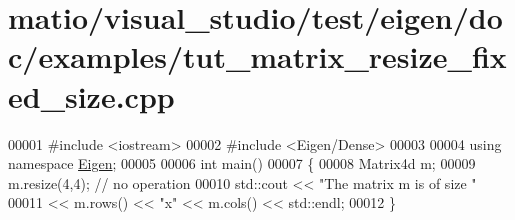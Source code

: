 \hypertarget{matio_2visual__studio_2test_2eigen_2doc_2examples_2tut__matrix__resize__fixed__size_8cpp_source}{}\section{matio/visual\+\_\+studio/test/eigen/doc/examples/tut\+\_\+matrix\+\_\+resize\+\_\+fixed\+\_\+size.cpp}
\label{matio_2visual__studio_2test_2eigen_2doc_2examples_2tut__matrix__resize__fixed__size_8cpp_source}

\begin{DoxyCode}
00001 \textcolor{preprocessor}{#include <iostream>}
00002 \textcolor{preprocessor}{#include <Eigen/Dense>}
00003 
00004 \textcolor{keyword}{using namespace }\hyperlink{namespace_eigen}{Eigen};
00005 
00006 \textcolor{keywordtype}{int} main()
00007 \{
00008   Matrix4d m;
00009   m.resize(4,4); \textcolor{comment}{// no operation}
00010   std::cout << \textcolor{stringliteral}{"The matrix m is of size "}
00011             << m.rows() << \textcolor{stringliteral}{"x"} << m.cols() << std::endl;
00012 \}
\end{DoxyCode}
